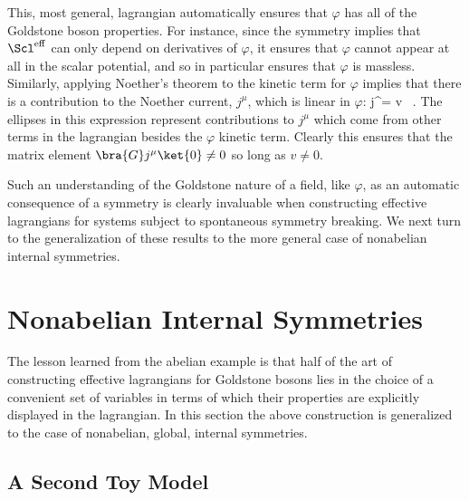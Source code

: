 This, most general, lagrangian automatically ensures that
$\varphi$ has all of the Goldstone boson properties. For
instance, since the symmetry implies that $\leff$ can only
depend on derivatives of 
$\varphi$, it ensures that $\varphi$ cannot appear at all
in the scalar potential, and so in particular ensures that
$\varphi$ is massless. Similarly, applying Noether's
theorem to the kinetic term for $\varphi$ implies that
there is a contribution to the Noether current, $j^\mu$,
which is linear in $\varphi$: 
%
\eq
\label{abelgbncex}
j^\mu =  \; v \;  \, . \eeq
%
The ellipses in this expression represent contributions to
$j^\mu$ which come from other terms in the lagrangian
besides the 
$\varphi$ kinetic term. Clearly this ensures that the
matrix element $\bra{G} j^\mu \ket{0} \neq 0$ so long as $v
\neq 0$.

Such an understanding of the Goldstone nature of a field,
like 
$\varphi$, as an automatic consequence of a symmetry is
clearly invaluable when constructing effective lagrangians
for systems subject to spontaneous symmetry breaking. We
next turn to the generalization of these results to the
more general case of nonabelian internal symmetries.

\section{Nonabelian Internal Symmetries}

The lesson learned from the abelian example is that half of
the art of constructing effective lagrangians for Goldstone
bosons lies in the choice of a convenient set of variables
in terms of which their properties are explicitly displayed
in the lagrangian. In this section the above construction is
generalized to the case of nonabelian, global, internal
symmetries.

\subsection{A Second Toy Model}

